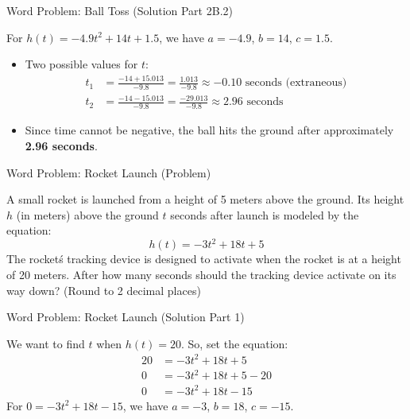 \documentclass[aspectratio=169]{beamer}
\begin{document}
\begin{frame}{Word Problem: Ball Toss (Solution Part 2B.2)}
    \begin{tcolorbox}[colback=lightgray,colframe=accent,title=Solution Part 2B.2: Final Answers and Conclusion]
        \footnotesize
        For $h(t) = -4.9t^2 + 14t + 1.5$, we have $a=-4.9$, $b=14$, $c=1.5$.
        \begin{itemize}
            \item Two possible values for $t$:
                \begin{align*}
                    t_1 &= \frac{-14 + 15.013}{-9.8} = \frac{1.013}{-9.8} \approx -0.10 \text{ seconds (extraneous)} \\
                    t_2 &= \frac{-14 - 15.013}{-9.8} = \frac{-29.013}{-9.8} \approx 2.96 \text{ seconds}
                \end{align*}
            \item Since time cannot be negative, the ball hits the ground after approximately \textbf{2.96 seconds}.
        \end{itemize}
    \end{tcolorbox}
\end{frame}

\begin{frame}{Word Problem: Rocket Launch (Problem)}
    \begin{tcolorbox}[colback=lightgray,colframe=primary,title=Problem]
        \footnotesize
        A small rocket is launched from a height of 5 meters above the ground. Its height $h$ (in meters) above the ground $t$ seconds after launch is modeled by the equation:
        \[ h(t) = -3t^2 + 18t + 5 \]
        The rocket\'s tracking device is designed to activate when the rocket is at a height of 20 meters. After how many seconds should the tracking device activate on its way down? (Round to 2 decimal places)
    \end{tcolorbox}
\end{frame}

\begin{frame}{Word Problem: Rocket Launch (Solution Part 1)}
    \begin{tcolorbox}[colback=lightgray,colframe=accent,title=Solution Part 1: Set up Equation and Identify Coefficients]
        \footnotesize
        We want to find $t$ when $h(t) = 20$. So, set the equation:
        \begin{align*}
            20 &= -3t^2 + 18t + 5 \\
            0 &= -3t^2 + 18t + 5 - 20 \\
            0 &= -3t^2 + 18t - 15
        \end{align*}
        For $0 = -3t^2 + 18t - 15$, we have $a=-3$, $b=18$, $c=-15$.
    \end{tcolorbox}
\end{frame}
\end{document}
